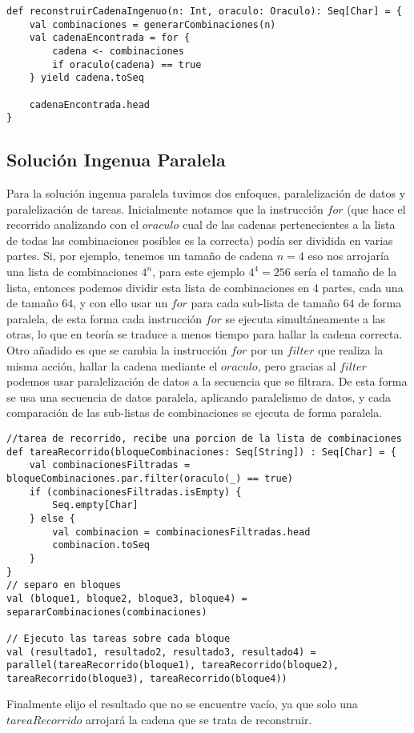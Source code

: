 \documentclass[conference]{IEEEtran}
\begin{document}
\begin{lstlisting}
def reconstruirCadenaIngenuo(n: Int, oraculo: Oraculo): Seq[Char] = {
    val combinaciones = generarCombinaciones(n)
    val cadenaEncontrada = for {
        cadena <- combinaciones
        if oraculo(cadena) == true
    } yield cadena.toSeq
    
    cadenaEncontrada.head
}
\end{lstlisting}

\subsection{\textbf{Solución Ingenua Paralela}}

Para la solución ingenua paralela tuvimos dos enfoques, paralelización de datos y paralelización de tareas. Inicialmente notamos que la instrucción $for$ (que hace el recorrido analizando con el $oraculo$ cual de las cadenas pertenecientes a la lista de todas las combinaciones posibles es la correcta) podía ser dividida en varias partes. Si, por ejemplo, tenemos un tamaño de cadena $n=4$ eso nos arrojaría una lista de combinaciones $4^n$, para este ejemplo $ 4^4 = 256$ sería el tamaño de la lista, entonces podemos dividir esta lista de combinaciones en 4 partes, cada una de tamaño $64$, y con ello usar un $for$ para cada sub-lista de tamaño $64$ de forma paralela, de esta forma cada instrucción $for$ se ejecuta simultáneamente a las otras, lo que en teoría se traduce a menos tiempo para hallar la cadena correcta. Otro añadido es que se cambia la instrucción $for$ por un $filter$ que realiza la misma acción, hallar la cadena mediante el $oraculo$, pero gracias al $filter$ podemos usar paralelización de datos a la secuencia que se filtrara. De esta forma se usa una secuencia de datos paralela, aplicando paralelismo de datos, y cada comparación de las sub-listas de combinaciones se ejecuta de forma paralela.

\begin{lstlisting}
//tarea de recorrido, recibe una porcion de la lista de combinaciones
def tareaRecorrido(bloqueCombinaciones: Seq[String]) : Seq[Char] = {
    val combinacionesFiltradas = bloqueCombinaciones.par.filter(oraculo(_) == true)
    if (combinacionesFiltradas.isEmpty) {
        Seq.empty[Char] 
    } else {
        val combinacion = combinacionesFiltradas.head
        combinacion.toSeq
    }  
}
// separo en bloques
val (bloque1, bloque2, bloque3, bloque4) = separarCombinaciones(combinaciones)

// Ejecuto las tareas sobre cada bloque
val (resultado1, resultado2, resultado3, resultado4) = parallel(tareaRecorrido(bloque1), tareaRecorrido(bloque2), tareaRecorrido(bloque3), tareaRecorrido(bloque4))
\end{lstlisting}
Finalmente elijo el resultado que no se encuentre vacío, ya que solo una $tareaRecorrido$ arrojará la cadena que se trata de reconstruir.
\end{document}
